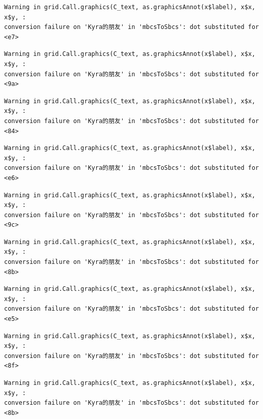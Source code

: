 \documentclass[
  letterpaper,
  DIV=11,
  numbers=noendperiod]{scrreprt}
\begin{document}
\begin{verbatim}
Warning in grid.Call.graphics(C_text, as.graphicsAnnot(x$label), x$x, x$y, :
conversion failure on 'Kyra的朋友' in 'mbcsToSbcs': dot substituted for <e7>
\end{verbatim}

\begin{verbatim}
Warning in grid.Call.graphics(C_text, as.graphicsAnnot(x$label), x$x, x$y, :
conversion failure on 'Kyra的朋友' in 'mbcsToSbcs': dot substituted for <9a>
\end{verbatim}

\begin{verbatim}
Warning in grid.Call.graphics(C_text, as.graphicsAnnot(x$label), x$x, x$y, :
conversion failure on 'Kyra的朋友' in 'mbcsToSbcs': dot substituted for <84>
\end{verbatim}

\begin{verbatim}
Warning in grid.Call.graphics(C_text, as.graphicsAnnot(x$label), x$x, x$y, :
conversion failure on 'Kyra的朋友' in 'mbcsToSbcs': dot substituted for <e6>
\end{verbatim}

\begin{verbatim}
Warning in grid.Call.graphics(C_text, as.graphicsAnnot(x$label), x$x, x$y, :
conversion failure on 'Kyra的朋友' in 'mbcsToSbcs': dot substituted for <9c>
\end{verbatim}

\begin{verbatim}
Warning in grid.Call.graphics(C_text, as.graphicsAnnot(x$label), x$x, x$y, :
conversion failure on 'Kyra的朋友' in 'mbcsToSbcs': dot substituted for <8b>
\end{verbatim}

\begin{verbatim}
Warning in grid.Call.graphics(C_text, as.graphicsAnnot(x$label), x$x, x$y, :
conversion failure on 'Kyra的朋友' in 'mbcsToSbcs': dot substituted for <e5>
\end{verbatim}

\begin{verbatim}
Warning in grid.Call.graphics(C_text, as.graphicsAnnot(x$label), x$x, x$y, :
conversion failure on 'Kyra的朋友' in 'mbcsToSbcs': dot substituted for <8f>
\end{verbatim}

\begin{verbatim}
Warning in grid.Call.graphics(C_text, as.graphicsAnnot(x$label), x$x, x$y, :
conversion failure on 'Kyra的朋友' in 'mbcsToSbcs': dot substituted for <8b>
\end{verbatim}
\end{document}
